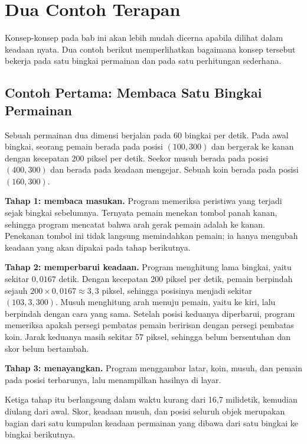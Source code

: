 \section{Dua Contoh Terapan}
\label{sec:contoh-bab-2}

Konsep-konsep pada bab ini akan lebih mudah dicerna apabila dilihat dalam
keadaan nyata. Dua contoh berikut memperlihatkan bagaimana konsep tersebut
bekerja pada satu bingkai permainan dan pada satu perhitungan sederhana.

\subsection{Contoh Pertama: Membaca Satu Bingkai Permainan}

\begin{contohbox}
Sebuah permainan dua dimensi berjalan pada 60 bingkai per detik. Pada awal
bingkai, seorang pemain berada pada posisi $(100, 300)$ dan bergerak ke kanan
dengan kecepatan 200 piksel per detik. Seekor musuh berada pada posisi
$(400, 300)$ dan berada pada keadaan mengejar. Sebuah koin berada pada posisi
$(160, 300)$.

\vspace{0.4em}
\textbf{Tahap 1: membaca masukan.} Program memeriksa peristiwa yang terjadi
sejak bingkai sebelumnya. Ternyata pemain menekan tombol panah kanan, sehingga
program mencatat bahwa arah gerak pemain adalah ke kanan. Penekanan tombol ini
tidak langsung memindahkan pemain; ia hanya mengubah keadaan yang akan dipakai
pada tahap berikutnya.

\vspace{0.4em}
\textbf{Tahap 2: memperbarui keadaan.} Program menghitung lama bingkai, yaitu
sekitar $0{,}0167$ detik. Dengan kecepatan 200 piksel per detik, pemain
berpindah sejauh $200 \times 0{,}0167 \approx 3{,}3$ piksel, sehingga posisinya
menjadi sekitar $(103{,}3, 300)$. Musuh menghitung arah menuju pemain, yaitu
ke kiri, lalu berpindah dengan cara yang sama. Setelah posisi keduanya
diperbarui, program memeriksa apakah persegi pembatas pemain beririsan dengan
persegi pembatas koin. Jarak keduanya masih sekitar 57 piksel, sehingga belum
bersentuhan dan skor belum bertambah.

\vspace{0.4em}
\textbf{Tahap 3: menayangkan.} Program menggambar latar, koin, musuh, dan
pemain pada posisi terbarunya, lalu menampilkan hasilnya di layar.

\vspace{0.4em}
Ketiga tahap itu berlangsung dalam waktu kurang dari 16,7 milidetik, kemudian
diulang dari awal. Skor, keadaan musuh, dan posisi seluruh
objek merupakan bagian dari satu kumpulan keadaan permainan yang dibawa dari
satu bingkai ke bingkai berikutnya.
\end{contohbox}

